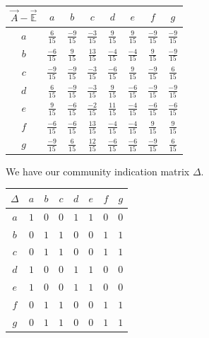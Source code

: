 \documentclass[a4paper, 10pt, twocolumn]{article}
\begin{document}
\begin{center}
       \begin{tabular}{c|ccccccc}
              $ \vec{A} - \vec{\mathbb{E}} $ & $ a $ & $ b $ & $ c $ & $ d $ & $ e $ & $ f $ & $ g $ \\
              \hline
              $ a $ & $ \frac{6}{15}  $ & $ \frac{-9}{15} $ & $ \frac{-3}{15} $ & $ \frac{9}{15}  $ & $ \frac{9}{15}  $ & $ \frac{-9}{15} $ & $ \frac{-9}{15} $ \\
              $ b $ & $ \frac{-6}{15} $ & $ \frac{9}{15}  $ & $ \frac{13}{15} $ & $ \frac{-4}{15} $ & $ \frac{-4}{15} $ & $ \frac{9}{15}  $ & $ \frac{-9}{15} $ \\
              $ c $ & $ \frac{-9}{15} $ & $ \frac{-9}{15} $ & $ \frac{-3}{15} $ & $ \frac{-6}{15} $ & $ \frac{9}{15}  $ & $ \frac{-9}{15} $ & $ \frac{6}{15}  $ \\
              $ d $ & $ \frac{6}{15}  $ & $ \frac{-9}{15} $ & $ \frac{-3}{15} $ & $ \frac{9}{15}  $ & $ \frac{-6}{15} $ & $ \frac{-9}{15} $ & $ \frac{-9}{15} $ \\
              $ e $ & $ \frac{9}{15}  $ & $ \frac{-6}{15} $ & $ \frac{-2}{15} $ & $ \frac{11}{15} $ & $ \frac{-4}{15} $ & $ \frac{-6}{15} $ & $ \frac{-6}{15} $ \\
              $ f $ & $ \frac{-6}{15} $ & $ \frac{-6}{15} $ & $ \frac{13}{15} $ & $ \frac{-4}{15} $ & $ \frac{-4}{15} $ & $ \frac{9}{15}  $ & $ \frac{9}{15}  $ \\
              $ g $ & $ \frac{-9}{15} $ & $ \frac{6}{15}  $ & $ \frac{12}{15} $ & $ \frac{-6}{15} $ & $ \frac{-6}{15} $ & $ \frac{-9}{15} $ & $ \frac{6}{15}  $ \\
       \end{tabular}
\end{center}

\noindent
We have our community indication matrix $ \varDelta $.

\begin{center}
       \begin{tabular}{c|ccccccc}
              $ \varDelta  $ & $ a $ & $ b $ & $ c $ & $ d $ & $ e $ & $ f $ & $ g $ \\
              \hline
              $ a $ & $ 1 $ & $ 0 $ & $ 0 $ & $ 1 $ & $ 1 $ & $ 0 $ & $ 0 $ \\
              $ b $ & $ 0 $ & $ 1 $ & $ 1 $ & $ 0 $ & $ 0 $ & $ 1 $ & $ 1 $ \\
              $ c $ & $ 0 $ & $ 1 $ & $ 1 $ & $ 0 $ & $ 0 $ & $ 1 $ & $ 1 $ \\
              $ d $ & $ 1 $ & $ 0 $ & $ 0 $ & $ 1 $ & $ 1 $ & $ 0 $ & $ 0 $ \\
              $ e $ & $ 1 $ & $ 0 $ & $ 0 $ & $ 1 $ & $ 1 $ & $ 0 $ & $ 0 $ \\
              $ f $ & $ 0 $ & $ 1 $ & $ 1 $ & $ 0 $ & $ 0 $ & $ 1 $ & $ 1 $ \\
              $ g $ & $ 0 $ & $ 1 $ & $ 1 $ & $ 0 $ & $ 0 $ & $ 1 $ & $ 1 $ \\
       \end{tabular}
\end{center}
\end{document}

